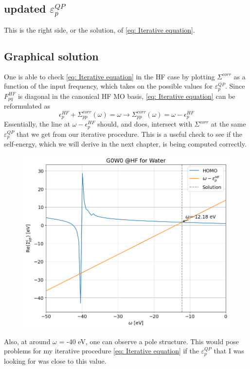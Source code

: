 \documentclass[12pt]{caltech_thesis}
\begin{document}
\subsection{updated $\varepsilon_{p}^{QP}$}
This is the right side, or the solution, of \ref{eq: Iterative equation}.
\newpage
\subsection{Graphical solution}
One is able to check \ref{eq: Iterative equation} in the HF case by plotting $\Sigma^{corr}$ as a function of the input frequency, which takes on  the possible values for $\varepsilon_{p}^{QP}$. Since $F_{pq}^{HF}$ is diagonal in the canonical HF MO basis, \ref{eq: Iterative equation} can be reformulated as
\begin{equation}
    \epsilon _{p}^{HF} + \Sigma_{pp}^{corr}(\omega) = \omega  \rightarrow \Sigma_{pp}^{corr}(\omega) = \omega  - \epsilon _{p}^{HF}
\end{equation}
Essentially, the line at $\omega - \epsilon_{p}^{HF}$ should, and does, intersect with $\Sigma^{corr}$ at the same $\varepsilon_{p}^{QP}$ that we get from our iterative procedure.
 This is a useful check to see if the self-energy, which we will derive in the next chapter, is being computed correctly.

\begin{figure}[h]
    \centering
    \includegraphics[width=\textwidth]{correlation_energies.png}
\end{figure}
Also, at around $\omega$ = -40 eV, one can observe a pole structure. This would pose problems for my iterative procedure \ref{eq: Iterative equation} if the $\varepsilon_{p}^{QP}$ that I was looking for was close to this value.
\end{document}
